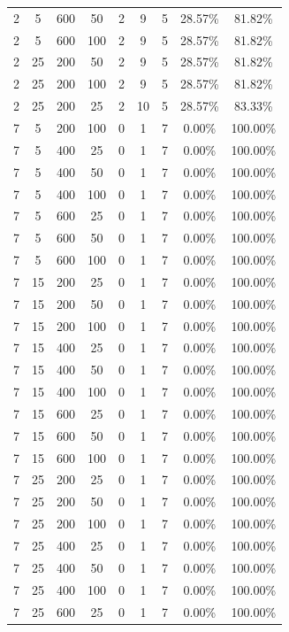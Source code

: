 {\begin{longtable}{| c | c | c | c | c | c | c | c | c |}
 2 & 5 & 600 & 50 & 2 & 9 & 5 & 28.57\% & 81.82\%   \\
 2 & 5 & 600 & 100 & 2 & 9 & 5 & 28.57\% & 81.82\%   \\
 2 & 25 & 200 & 50 & 2 & 9 & 5 & 28.57\% & 81.82\%   \\
 2 & 25 & 200 & 100 & 2 & 9 & 5 & 28.57\% & 81.82\%   \\
 2 & 25 & 200 & 25 & 2 & 10 & 5 & 28.57\% & 83.33\%   \\
 7 & 5 & 200 & 100 & 0 & 1 & 7 & 0.00\% & 100.00\%   \\
 7 & 5 & 400 & 25 & 0 & 1 & 7 & 0.00\% & 100.00\%   \\
 7 & 5 & 400 & 50 & 0 & 1 & 7 & 0.00\% & 100.00\%   \\
 7 & 5 & 400 & 100 & 0 & 1 & 7 & 0.00\% & 100.00\%   \\
 7 & 5 & 600 & 25 & 0 & 1 & 7 & 0.00\% & 100.00\%   \\
 7 & 5 & 600 & 50 & 0 & 1 & 7 & 0.00\% & 100.00\%   \\
 7 & 5 & 600 & 100 & 0 & 1 & 7 & 0.00\% & 100.00\%   \\
 7 & 15 & 200 & 25 & 0 & 1 & 7 & 0.00\% & 100.00\%   \\
 7 & 15 & 200 & 50 & 0 & 1 & 7 & 0.00\% & 100.00\%   \\
 7 & 15 & 200 & 100 & 0 & 1 & 7 & 0.00\% & 100.00\%   \\
 7 & 15 & 400 & 25 & 0 & 1 & 7 & 0.00\% & 100.00\%   \\
 7 & 15 & 400 & 50 & 0 & 1 & 7 & 0.00\% & 100.00\%   \\
  7 & 15 & 400 & 100 & 0 & 1 & 7 & 0.00\% & 100.00\%   \\
 7 & 15 & 600 & 25 & 0 & 1 & 7 & 0.00\% & 100.00\%   \\
 7 & 15 & 600 & 50 & 0 & 1 & 7 & 0.00\% & 100.00\%   \\
 7 & 15 & 600 & 100 & 0 & 1 & 7 & 0.00\% & 100.00\%   \\
 7 & 25 & 200 & 25 & 0 & 1 & 7 & 0.00\% & 100.00\%   \\
 7 & 25 & 200 & 50 & 0 & 1 & 7 & 0.00\% & 100.00\%   \\
 7 & 25 & 200 & 100 & 0 & 1 & 7 & 0.00\% & 100.00\%   \\
 7 & 25 & 400 & 25 & 0 & 1 & 7 & 0.00\% & 100.00\%   \\
 7 & 25 & 400 & 50 & 0 & 1 & 7 & 0.00\% & 100.00\%   \\
 7 & 25 & 400 & 100 & 0 & 1 & 7 & 0.00\% & 100.00\%   \\
 7 & 25 & 600 & 25 & 0 & 1 & 7 & 0.00\% & 100.00\%   \\

\end{longtable}}
